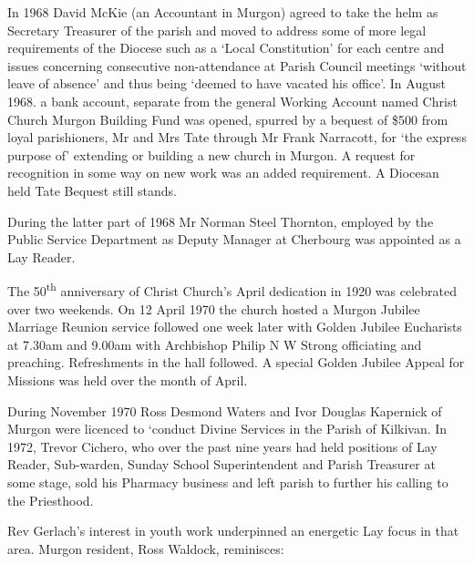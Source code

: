 In 1968 David McKie (an Accountant in Murgon) agreed to take the helm as
Secretary Treasurer of the parish and moved to address some of more
legal requirements of the Diocese such as a `Local Constitution' for
each centre and issues concerning consecutive non-attendance at Parish
Council meetings `without leave of absence' and thus being `deemed to
have vacated his office'. In August 1968. a bank account, separate from
the general Working Account named Christ Church Murgon Building Fund was
opened, spurred by a bequest of \$500 from loyal parishioners, Mr and
Mrs Tate through Mr Frank Narracott, for `the express purpose of'
extending or building a new church in Murgon. A request for recognition
in some way on new work was an added requirement. A Diocesan held Tate
Bequest still stands.

During the latter part of 1968 Mr Norman Steel Thornton, employed by the
Public Service Department as Deputy Manager at Cherbourg was appointed
as a Lay Reader.

The 50\textsuperscript{th} anniversary of Christ Church's April
dedication in 1920 was celebrated over two weekends. On 12 April 1970
the church hosted a Murgon Jubilee Marriage Reunion service followed one
week later with Golden Jubilee Eucharists at 7.30am and 9.00am with
Archbishop Philip N W Strong officiating and preaching. Refreshments in
the hall followed. A special Golden Jubilee Appeal for Missions was held
over the month of April.

During November 1970 Ross Desmond Waters and Ivor Douglas Kapernick of
Murgon were licenced to `conduct Divine Services in the Parish of
Kilkivan. In 1972, Trevor Cichero, who over the past nine years had held
positions of Lay Reader, Sub-warden, Sunday School Superintendent and
Parish Treasurer at some stage, sold his Pharmacy business and left
parish to further his calling to the Priesthood.

Rev Gerlach's interest in youth work underpinned an energetic Lay focus
in that area. Murgon resident, Ross Waldock, reminisces:

